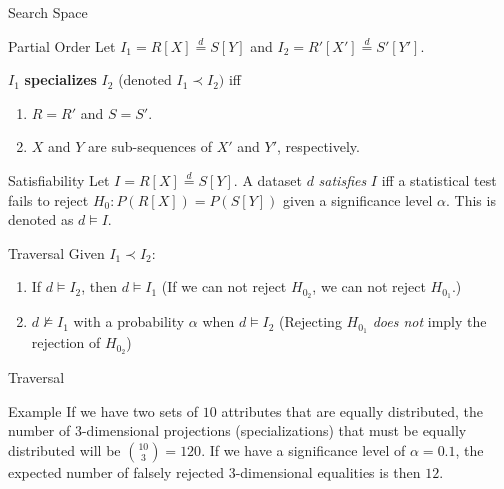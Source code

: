 \documentclass[10pt]{beamer}
\newcommand{\eqdist}{\stackrel{d}{=}}
\begin{document}
\begin{frame}{Search Space}
    \begin{block}{Partial Order}
        Let $I_1 = R[X] \eqdist S[Y]$ and $I_2 = R'[X'] \eqdist S'[Y']$.
        
        $I_1$ \textbf{specializes} $I_2$ (denoted $I_1 \prec I_2)$ iff
        \begin{enumerate}
            \item $R = R'$ and $S = S'$.
            \item $X$ and $Y$ are sub-sequences of $X'$ and $Y'$, respectively.
        \end{enumerate}
    \end{block}

    \begin{block}{Satisfiability}
    Let $I = R[X] \eqdist S[Y]$.
    A dataset $d$ \emph{satisfies} $I$ iff  a statistical test fails to reject $H_0: P(R[X]) = P(S[Y])$
    given a significance level $\alpha$.
    This is denoted as $d \models I$.
    \end{block}
\end{frame}

\begin{frame}{Traversal}
    Given $I_1 \prec I_2$:
    
    \begin{enumerate}
        \item If $d \models I_2$, then $d \models I_1$ (If we can not reject $H_{0_2}$, we can not reject $H_{0_1}$.)
        \item $d \not\models I_1$ with a probability $\alpha$ when $d \models I_2$
            (Rejecting $H_{0_1}$ \emph{does not} imply the rejection of $H_{0_2}$)
    \end{enumerate}
\end{frame}

\begin{frame}{Traversal}
    \begin{exampleblock}{Example}
    \smallskip
    If we have two sets of $10$ attributes that are equally distributed, the number of
    3-dimensional projections (specializations) that must be equally distributed will be $\binom{10}{3} = 120$.
    If we have a significance level of $\alpha = 0.1$, the expected number of
    falsely rejected 3-dimensional equalities is then $12$.
    \end{exampleblock}
\end{frame}
\end{document}
